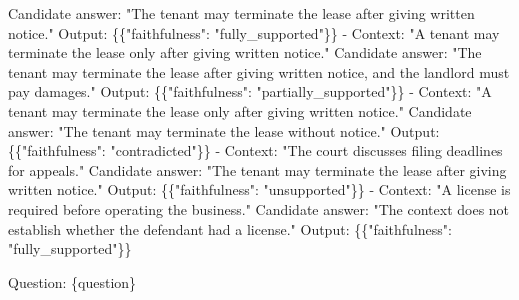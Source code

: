 \documentclass{article}
\theoremstyle{plain}
\theoremstyle{definition}
\theoremstyle{remark}
\begin{document}
{\begin{minipage}{0.94\textwidth}
\hspace*{2em}Candidate answer: "The tenant may terminate the lease after giving written notice."\newline
\hspace*{2em}Output: \{\{"faithfulness": "fully\_supported"\}\}\newline
- Context: "A tenant may terminate the lease only after giving written notice."\newline
\hspace*{2em}Candidate answer: "The tenant may terminate the lease after giving written notice, and the landlord must pay damages."\newline
\hspace*{2em}Output: \{\{"faithfulness": "partially\_supported"\}\}\newline
- Context: "A tenant may terminate the lease only after giving written notice."\newline
\hspace*{2em}Candidate answer: "The tenant may terminate the lease without notice."\newline
\hspace*{2em}Output: \{\{"faithfulness": "contradicted"\}\}\newline
- Context: "The court discusses filing deadlines for appeals."\newline
\hspace*{2em}Candidate answer: "The tenant may terminate the lease after giving written notice."\newline
\hspace*{2em}Output: \{\{"faithfulness": "unsupported"\}\}\newline
- Context: "A license is required before operating the business."\newline
\hspace*{2em}Candidate answer: "The context does not establish whether the defendant had a license."\newline
\hspace*{2em}Output: \{\{"faithfulness": "fully\_supported"\}\}\par
\vspace{0.55em}
Question:\newline
\textasciigrave{}\textasciigrave{}\textasciigrave{}\newline
\{question\}\newline
\textasciigrave{}\textasciigrave{}\textasciigrave{}\par
\vspace{0.55em}

\end{minipage}}
\end{document}
